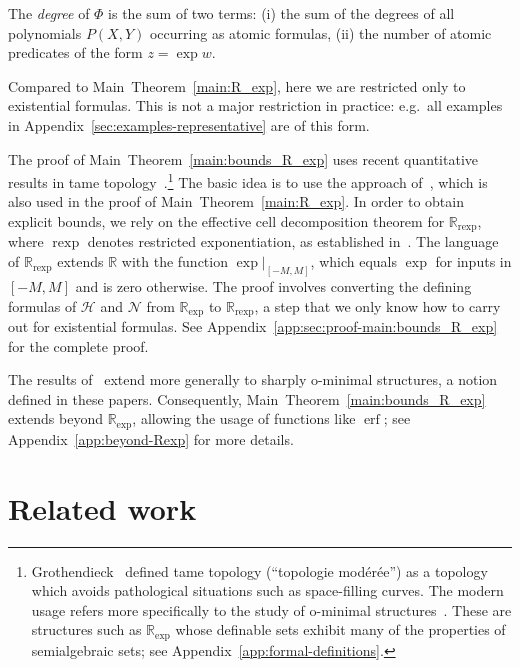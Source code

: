 \documentclass[11pt]{article}
\theoremstyle{plain}
\theoremstyle{definition}
\theoremstyle{remark}
\newcommand{\R}{\mathbb{R}}
\newcommand{\erf}{\operatorname{erf}}
\newcommand{\rexp}{\operatorname{rexp}}
\begin{document}
The \emph{degree} of $\Phi$ is the sum of two terms: (i) the sum of the degrees of all polynomials $P(X,Y)$ occurring as atomic formulas, (ii) the number of atomic predicates of the form $z = \exp w$.

Compared to Main~Theorem~\ref{main:R_exp}, here we are restricted only to existential formulas. This is not a major restriction in practice: e.g.\ all examples in Appendix~\ref{sec:examples-representative} are of this form. 

The proof of Main~Theorem~\ref{main:bounds_R_exp} uses recent quantitative results in tame topology~\cite{binyamini2020effective,binyamini2022sharply}.\footnote{Grothendieck~\cite{Gro} defined tame topology (``topologie mod\'er\'ee'') as a topology which avoids pathological situations such as space-filling curves. The modern usage refers more specifically to the study of o-minimal structures~\cite{vandenDries98}. These are structures such as $\R_{\exp}$ whose definable sets exhibit many of the properties of semialgebraic sets; see Appendix~\ref{app:formal-definitions}.}
The basic idea is to use the approach of~\cite{LaskowskiCompression}, which is also used in the proof of Main~Theorem~\ref{main:R_exp}. In order to obtain explicit bounds, we rely on the effective cell decomposition theorem for $\R_{\rexp}$, where $\rexp$ denotes restricted exponentiation, as established in~\cite{binyamini2020effective,binyamini2022sharply}.
The language of $\R_{\rexp}$ extends $\R$ with the function $\exp|_{[-M,M]}$, which equals $\exp$ for inputs in $[-M,M]$ and is zero otherwise. The proof involves converting the defining formulas of $\mathcal H$ and $\mathcal N$ from $\R_{\exp}$ to $\R_{\rexp}$, a step that we only know how to carry out for existential formulas. See Appendix~\ref{app:sec:proof-main:bounds_R_exp} for the complete proof.

The results of~\cite{binyamini2020effective,binyamini2022sharply} extend more generally to sharply o-minimal structures, a notion defined in these papers. Consequently, Main~Theorem~\ref{main:bounds_R_exp} extends beyond $\R_{\exp}$, allowing the usage of functions like $\erf$; see Appendix~\ref{app:beyond-Rexp} for more details.


\section{Related work}\label{sec:relatedwork}
\end{document}
